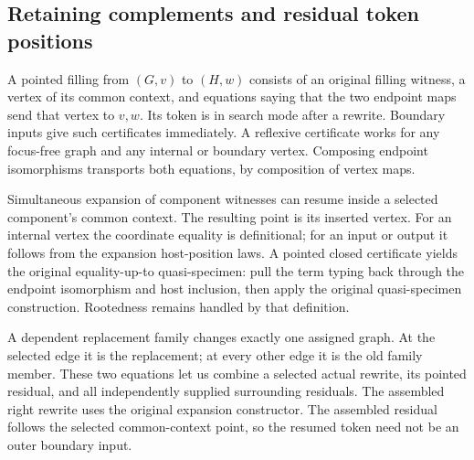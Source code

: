 
\subsection{Retaining complements and residual token positions}
A pointed filling from $(G,v)$ to $(H,w)$ consists of an original filling
witness, a vertex of its common context, and equations saying that the two
endpoint maps send that vertex to $v,w$. Its token is in search mode after
a rewrite. Boundary inputs give such certificates immediately. A reflexive
certificate works for any focus-free graph and any internal or boundary
vertex. Composing endpoint isomorphisms transports both equations, by
composition of vertex maps.


Simultaneous expansion of component witnesses can resume inside a selected
component's common context. The resulting point is its inserted vertex.
For an internal vertex the coordinate equality is definitional; for an input
or output it follows from the expansion host-position laws. A pointed closed
certificate yields the original equality-up-to quasi-specimen: pull the
term typing back through the endpoint isomorphism and host inclusion, then
apply the original quasi-specimen construction. Rootedness remains handled
by that definition.


A dependent replacement family changes exactly one assigned graph. At the
selected edge it is the replacement; at every other edge it is the old
family member. These two equations let us combine a selected actual rewrite,
its pointed residual, and all independently supplied surrounding residuals.
The assembled right rewrite uses the original expansion constructor.
The assembled residual follows the selected common-context point, so the
resumed token need not be an outer boundary input.

